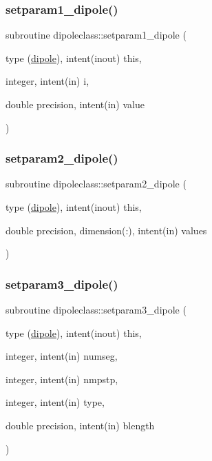 \mbox{\label{namespacedipoleclass_a88c00f58bdecf1b9c087e1fa6fe4d890}} 
\subsubsection{\texorpdfstring{setparam1\_dipole()}{setparam1\_dipole()}}
{\footnotesize\ttfamily subroutine dipoleclass\+::setparam1\+\_\+dipole (\begin{DoxyParamCaption}\item[{type (\mbox{\hyperlink{namespacedipoleclass_structdipoleclass_1_1dipole}{dipole}}), intent(inout)}]{this,  }\item[{integer, intent(in)}]{i,  }\item[{double precision, intent(in)}]{value }\end{DoxyParamCaption})}

\mbox{\label{namespacedipoleclass_af9b4f7bb26e407880166d1b7d19f8877}} 
\subsubsection{\texorpdfstring{setparam2\_dipole()}{setparam2\_dipole()}}
{\footnotesize\ttfamily subroutine dipoleclass\+::setparam2\+\_\+dipole (\begin{DoxyParamCaption}\item[{type (\mbox{\hyperlink{namespacedipoleclass_structdipoleclass_1_1dipole}{dipole}}), intent(inout)}]{this,  }\item[{double precision, dimension(\+:), intent(in)}]{values }\end{DoxyParamCaption})}

\mbox{\label{namespacedipoleclass_a46e12e75054e010d776e23895101e223}} 
\subsubsection{\texorpdfstring{setparam3\_dipole()}{setparam3\_dipole()}}
{\footnotesize\ttfamily subroutine dipoleclass\+::setparam3\+\_\+dipole (\begin{DoxyParamCaption}\item[{type (\mbox{\hyperlink{namespacedipoleclass_structdipoleclass_1_1dipole}{dipole}}), intent(inout)}]{this,  }\item[{integer, intent(in)}]{numseg,  }\item[{integer, intent(in)}]{nmpstp,  }\item[{integer, intent(in)}]{type,  }\item[{double precision, intent(in)}]{blength }\end{DoxyParamCaption})}



